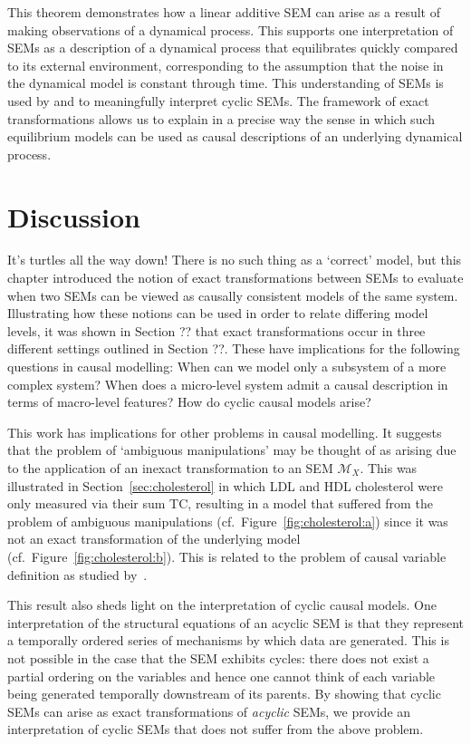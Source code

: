 This theorem demonstrates how a linear additive SEM can arise as a result of making observations of a dynamical process.
This supports one interpretation of SEMs as a description of a dynamical process that equilibrates quickly compared to its external environment, corresponding to the assumption that the noise in the dynamical model is constant through time.
This understanding of SEMs is used by \cite{lacerda2012discovering,Mooij_et_al_NIPS_11,hyttinen2012learning,mooij2013ode} and \cite{mooij2013cyclic} to meaningfully interpret cyclic SEMs.
The framework of exact transformations allows us to explain in a precise way the sense in which such equilibrium models can be used as causal descriptions of an underlying dynamical process.


\section{Discussion}

It's turtles all the way down!
There is no such thing as a `correct' model, but this chapter introduced the notion of exact transformations between SEMs to evaluate when two SEMs can be viewed as causally consistent models of the same system.
Illustrating how these notions can be used in order to relate differing model levels, it was shown in Section ?? that exact transformations occur in three different settings outlined in Section ??.
These have implications for the following questions in causal modelling: When can we model only a subsystem of a more complex system? When does a micro-level system admit a causal description in terms of macro-level features? How do cyclic causal models arise?

This work has implications for other problems in causal modelling.
It suggests that the problem of `ambiguous manipulations' \citep{spirtes2004causal} may be thought of as arising due to the application of an inexact transformation to an SEM $\mathcal{M}_X$.
This was illustrated in Section~\ref{sec:cholesterol} in which LDL and HDL cholesterol were only measured via their sum TC, resulting in a model that suffered from the problem of ambiguous manipulations (cf.\ Figure~\ref{fig:cholesterol:a}) since it was not an exact transformation of the underlying model (cf.\ Figure~\ref{fig:cholesterol:b}).
This is related to the problem of causal variable definition as studied by~\cite{eberhardt2016green}.

This result also sheds light on the interpretation of cyclic causal models.
One interpretation of the structural equations of an acyclic SEM is that they represent a temporally ordered series of mechanisms by which data are generated.
This is not possible in the case that the SEM exhibits cycles: there does not exist a partial ordering on the variables and hence one cannot think of each variable being generated temporally downstream of its parents.
By showing that cyclic SEMs can arise as exact transformations of \emph{acyclic} SEMs, we provide an interpretation of cyclic SEMs that does not suffer from the above problem.


